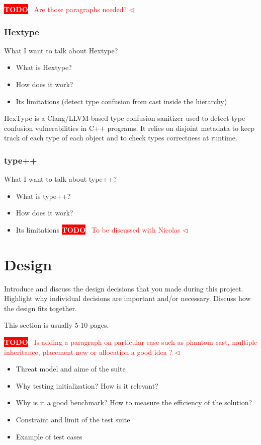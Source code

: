\documentclass[a4paper,11pt,oneside]{report}
\newcommand{\todobox}[3]{%
       \colorbox{#1}{\textcolor{white}{\sffamily\bfseries\scriptsize #2}}%
       ~\textcolor{#1}{#3} %
       \textcolor{#1}{$\triangleleft$}%
}
\newcommand{\adrbqt}[1]{\todobox{red}{TODO}{#1}}
\begin{document}
\adrbqt{Are those paragraphs needed?}
\subsection{Hextype}
What I want to talk about Hextype?
\begin{itemize}
       \item What is Hextype?
       \item How does it work?
       \item Its limitations (detect type confusion from cast inside the hierarchy)
\end{itemize}

HexType is a Clang/LLVM-based type confusion sanitizer used to detect type confusion vulnerabilities in C++ programs. 
It relies on disjoint metadata to keep track of each type of each object and to check types correctness at runtime.

\subsection{type++}

What I want to talk about type++?
\begin{itemize}
       \item What is type++?
       \item How does it work?
       \item Its limitations \adrbqt{To be discussed with Nicolas}
\end{itemize}


\chapter{Design}

Introduce and discuss the design decisions that you made during this project.
Highlight why individual decisions are important and/or necessary. Discuss
how the design fits together.

This section is usually 5-10 pages.

\adrbqt{Is adding a paragraph on particular case such as phantom cast, multiple inheritance, placement new or allocation a good idea ?}

\begin{itemize}
       \item Threat model and aime of the suite 
       \item Why testing initialization? How is it relevant?
       \item Why is it a good benchmark? How to measure the efficiency of the solution?
       \item Constraint and limit of the test suite
       \item Example of test cases

\end{itemize}
\end{document}
